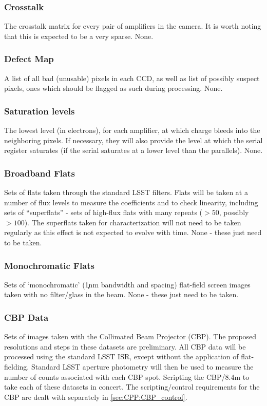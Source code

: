 \subsubsection{Crosstalk}\label{sec:CPP:inputs:crosstalk}
\cameraTeam
The crosstalk matrix for every pair of amplifiers in the camera. It is worth noting that this is expected to be a very sparse.
\alg None.


\subsubsection{Defect Map}\label{sec:CPP:inputs:defectList} 
\cameraTeam
A list of all bad (unusable) pixels in each CCD, as well as list of possibly suspect pixels, \ie ones which should be flagged as such during processing.
\alg None.


\subsubsection{Saturation levels}\label{sec:CPP:inputs:saturationLevel}
\cameraTeam
The lowest level (in electrons), for each amplifier, at which charge bleeds into the neighboring pixels. If necessary, they will also provide the level at which the serial register saturates (\ie if the serial saturates at a lower level than the parallels).
\alg None.


\subsubsection{Broadband Flats}\label{sec:CPP:inputs:broadFlat}
Sets of flats taken through the standard LSST filters. Flats will be taken at a number of flux levels to measure the \bfeffect coefficients and to check linearity, including sets of ``superflats'' - sets of high-flux flats with many repeats ($>50$, possibly $>100$). The superflats taken for \bfeffect characterization will not need to be taken regularly as this effect is not expected to evolve with time.
\alg None - these just need to be taken.


\subsubsection{Monochromatic Flats}\label{sec:CPP:inputs:monoFlat}
Sets of `monochromatic' (\c 1nm bandwidth and spacing) flat-field screen images taken with no filter/glass in the beam.
\alg None - these just need to be taken.


\subsubsection{CBP Data}\label{sec:CPP:inputs:CBP}
Sets of images taken with the Collimated Beam Projector (CBP). The proposed resolutions and steps in these datasets are preliminary. All CBP data will be processed using the standard LSST ISR, except without the application of flat-fielding. Standard LSST aperture photometry will then be used to measure the number of counts associated with each CBP spot.
\alg Scripting the CBP/8.4m to take each of these datasets in concert. The scripting/control requirements for the CBP are dealt with separately in \secsymbol\ref{sec:CPP:CBP_control}.


